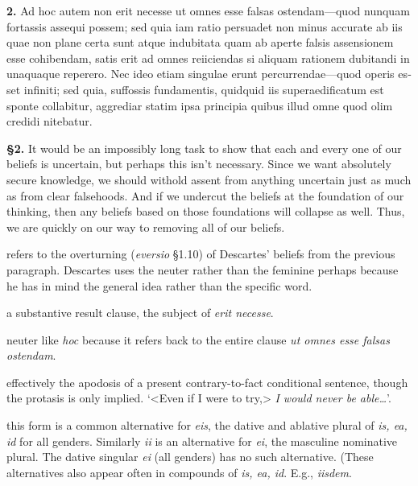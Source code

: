 
\clearpage

\beginnumbering
\pstart
\begin{latin}
    \textenglish{\textbf{2.}} Ad hoc autem non erit necesse ut omnes esse falsas ostendam---quod nunquam fortassis assequi possem; sed quia iam ratio persuadet non minus accurate ab iis quae non plane certa sunt atque indubitata quam ab aperte falsis assensionem esse cohibendam, satis erit ad omnes reiiciendas si aliquam rationem dubitandi in unaquaque reperero. Nec ideo etiam singulae erunt percurrendae---quod operis esset infiniti; sed quia, suffossis fundamentis, quidquid iis superaedificatum est sponte collabitur, aggrediar statim ipsa principia quibus illud omne quod olim credidi nitebatur.
\end{latin}
\pend
\endnumbering

\prenotes

\textbf{§2.} It would be an impossibly long task to show that each and every one of our beliefs is uncertain, but perhaps this isn't necessary. Since we want absolutely secure knowledge, we should withold assent from anything uncertain just as much as from clear falsehoods. And if we undercut the beliefs at the foundation of our thinking, then any beliefs based on those foundations will collapse as well. Thus, we are quickly on our way to removing all of our beliefs.

 refers to the overturning (\textit{eversio} §1.10) of Descartes' beliefs from the previous paragraph. Descartes uses the neuter rather than the feminine perhaps because he has in mind the general idea rather than the specific word.

 a substantive result clause, the subject of \textit{erit necesse}.

 neuter like \textit{hoc} because it refers back to the entire clause \textit{ut omnes esse falsas ostendam}.

 effectively the apodosis of a present contrary-to-fact conditional sentence, though the protasis is only implied. `<Even if I were to try,> \textit{I would never be able\dots}'.

 this form is a common alternative for \textit{eis}, the dative and ablative plural of \textit{is, ea, id} for all genders. Similarly \textit{ii} is an alternative for \textit{ei}, the masculine nominative plural. The dative singular \textit{ei} (all genders) has no such alternative. (These alternatives also appear often in compounds of \textit{is, ea, id}. E.g., \textit{iisdem}.

